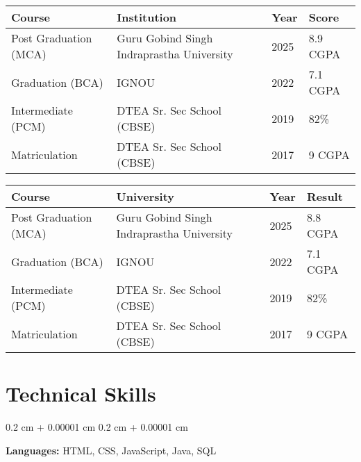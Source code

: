 \documentclass[10pt, letterpaper]{article}
\newenvironment{onecolentry}{
    \begin{adjustwidth}{
        0.2 cm + 0.00001 cm
    }{
        0.2 cm + 0.00001 cm
    }
}{
    \end{adjustwidth}
} %
\begin{document}
\begin{table}[h!]
    \centering
    \renewcommand{\arraystretch}{1.4} %
    \setlength{\tabcolsep}{12pt} %
    \begin{tabular}{|p{4.5cm}|p{7cm}|p{1cm}|p{2.5cm}|}
        \hline
        \textbf{Course} & \textbf{Institution} & \textbf{Year} & \textbf{Score} \\ \hline
        Post Graduation (MCA) & Guru Gobind Singh Indraprastha University & 2025 & 8.9 CGPA \\ \hline
        Graduation (BCA) & IGNOU & 2022 & 7.1 CGPA \\ \hline
        Intermediate (PCM) & DTEA Sr. Sec School (CBSE) & 2019 & 82\% \\ \hline
        Matriculation & DTEA Sr. Sec School (CBSE) & 2017 & 9 CGPA \\ \hline
    \end{tabular}


\begin{table}[h!]
    \centering
    \renewcommand{\arraystretch}{1.4} %
    \setlength{\tabcolsep}{12pt} %
    \begin{tabular}{|p{3.8cm}|p{6.7cm}|p{1cm}|p{2.5cm}|}
        \hline
        \textbf{Course} & \textbf{University} & \textbf{Year} & \textbf{Result} \\ \hline
        Post Graduation (MCA) & Guru Gobind Singh Indraprastha University & 2025 & 8.8 CGPA \\ \hline
        Graduation (BCA) & IGNOU & 2022 & 7.1 CGPA \\ \hline
        Intermediate (PCM) & DTEA Sr. Sec School (CBSE) & 2019 & 82\% \\ \hline
        Matriculation & DTEA Sr. Sec School (CBSE) & 2017 & 9 CGPA \\ \hline
    \end{tabular}
\end{table}
\end{table}

\vspace{-0.40 cm}

\section{Technical Skills}

        
        \begin{onecolentry}
            \textbf{Languages:} HTML, CSS, JavaScript, Java, SQL
        \end{onecolentry}
\end{document}
